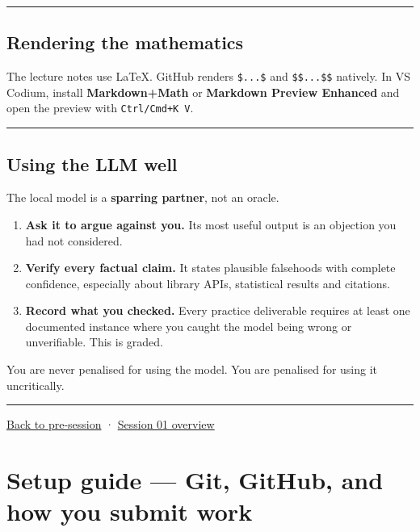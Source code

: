 \documentclass[
  letterpaper,
  10pt,
  twoside,
  openright,
  numbers=noenddot,
  chapterprefix=true]{scrbook}
\providecommand{\tightlist}{%
  \setlength{\itemsep}{0pt}\setlength{\parskip}{0pt}}
\begin{document}
\begin{center}\rule{0.5\linewidth}{0.5pt}\end{center}

\subsection{Rendering the mathematics}\label{rendering-the-mathematics}

The lecture notes use LaTeX. GitHub renders \texttt{\$...\$} and
\texttt{\$\$...\$\$} natively. In VS Codium, install
\textbf{Markdown+Math} or \textbf{Markdown Preview Enhanced} and open
the preview with \texttt{Ctrl/Cmd+K\ V}.

\begin{center}\rule{0.5\linewidth}{0.5pt}\end{center}

\subsection{Using the LLM well}\label{using-the-llm-well}

The local model is a \textbf{sparring partner}, not an oracle.

\begin{enumerate}
\def\labelenumi{\arabic{enumi}.}
\tightlist
\item
  \textbf{Ask it to argue against you.} Its most useful output is an
  objection you had not considered.
\item
  \textbf{Verify every factual claim.} It states plausible falsehoods
  with complete confidence, especially about library APIs, statistical
  results and citations.
\item
  \textbf{Record what you checked.} Every practice deliverable requires
  at least one documented instance where you caught the model being
  wrong or unverifiable. This is graded.
\end{enumerate}

You are never penalised for using the model. You are penalised for using
it uncritically.

\begin{center}\rule{0.5\linewidth}{0.5pt}\end{center}

\href{https://github.com/warint/quantitative-methods/blob/main/README.md}{Back
to pre-session} ·
\href{https://github.com/warint/quantitative-methods/blob/main/README.md}{Session
01 overview}

\section{Setup guide --- Git, GitHub, and how you submit
work}\label{git-and-github}
\end{document}
